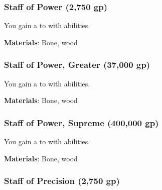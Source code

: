 \lowercase{\hypertarget{item:Staff of Power}{}}\label{item:Staff of Power}
\hypertarget{item:Staff of Power}{\subsubsection{Staff of Power\hfill{} (2,750 gp)}}

You gain a   to  with  abilities.



\vspace{0.25em}
\textbf{Materials}: Bone, wood


\lowercase{\hypertarget{item:Staff of Power, Greater}{}}\label{item:Staff of Power, Greater}
\hypertarget{item:Staff of Power, Greater}{\subsubsection{Staff of Power, Greater\hfill{} (37,000 gp)}}

You gain a   to  with  abilities.



\vspace{0.25em}
\textbf{Materials}: Bone, wood


\lowercase{\hypertarget{item:Staff of Power, Supreme}{}}\label{item:Staff of Power, Supreme}
\hypertarget{item:Staff of Power, Supreme}{\subsubsection{Staff of Power, Supreme\hfill{} (400,000 gp)}}

You gain a   to  with  abilities.



\vspace{0.25em}
\textbf{Materials}: Bone, wood


\lowercase{\hypertarget{item:Staff of Precision}{}}\label{item:Staff of Precision}
\hypertarget{item:Staff of Precision}{\subsubsection{Staff of Precision\hfill{} (2,750 gp)}}

